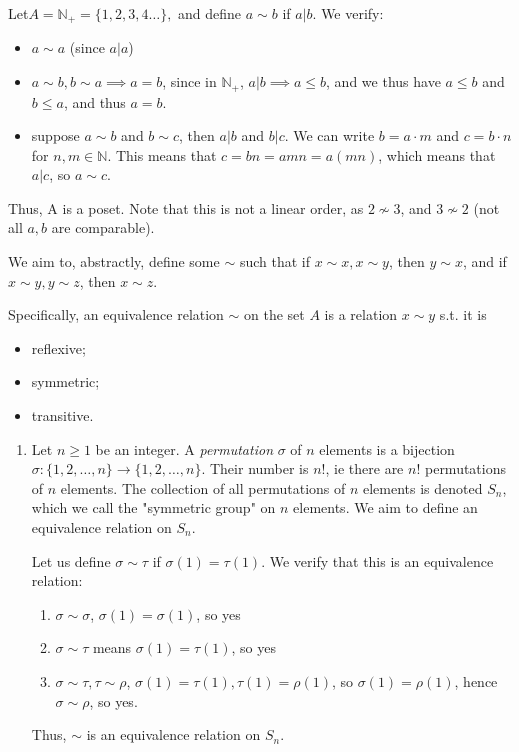 \documentclass[12pt,oneside]{article}
\begin{document}
\begin{example}
  Let\footnotemark $A = \mathbb{N}_+ = \{1, 2, 3, 4 \dots\},$ and define $a \sim b$ if $a|b$. We verify:
  \begin{itemize}
    \item $a \sim a$ (since $a|a$)
    \item $a\sim b, b \sim a \implies a = b$, since in $\mathbb{N}_+$, $a|b \implies a \leq b$, and we thus have $a \leq b$ and $b \leq a$, and thus $a = b$.
    \item suppose $a \sim b$ and $b \sim c$, then $a|b$ and $b|c$. We can write $b = a\cdot m$ and $c = b\cdot n$ for $n,m \in \mathbb{N}$. This means that $c = bn = amn = a(mn)$, which means that $a|c$, so $a \sim c$.
  \end{itemize}
  Thus, A is a poset. Note that this is not a linear order, as $2 \nsim 3$, and $3 \nsim 2$ (not all $a,b$ are comparable).
\end{example}

\begin{definition}
  We aim to, abstractly, define some $\sim$ such that if $x \sim x, x \sim y$, then $y\sim x$, and if $x \sim y, y \sim z$, then $x \sim z$.

  Specifically, an equivalence relation $\sim$ on the set $A$ is a relation $x \sim y$ s.t. it is
  \begin{itemize}
    \item reflexive;
    \item symmetric;
    \item transitive.\footnotemark
  \end{itemize}
\end{definition}

\begin{example}\label{example:equiv1}
\begin{enumerate}
  \item Let $n \geq 1$ be an integer. A \emph{permutation} $\sigma$ of $n$ elements is a bijection $\sigma: \{1, 2, \dots, n\} \to \{1, 2, \dots, n\}$. Their number is $n!$, ie there are $n!$ permutations of $n$ elements. The collection of all permutations of $n$ elements is denoted $S_n$, which we call the "symmetric group" on $n$ elements. We aim to define an equivalence relation on $S_n$.
  
  Let us define $\sigma \sim \tau$ if $\sigma(1) = \tau(1)$. We verify that this is an equivalence relation:
  \begin{enumerate}
    \item $\sigma \sim \sigma$, $\sigma(1)=\sigma(1)$, so yes
    \item $\sigma \sim \tau$ means $\sigma(1) = \tau(1)$, so yes
    \item $\sigma \sim \tau, \tau \sim \rho$, $\sigma(1) = \tau(1), \tau(1) = \rho(1)$, so $\sigma(1) = \rho(1)$, hence $\sigma \sim \rho$, so yes.
  \end{enumerate}
  Thus, $\sim$ is an equivalence relation on $S_n$.
\end{enumerate}  
\end{example}
\end{document}
